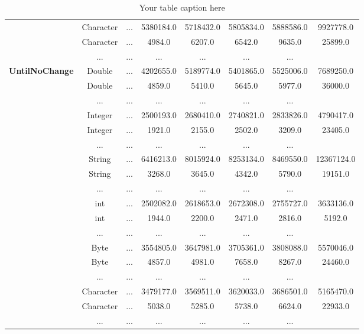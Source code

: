\documentclass{article}
\begin{document}
\begin{table}[h]
{\begin{tabular}{|c|c|c|c|c|c|c|c|}
 & Character & ... & 5380184.0 & 5718432.0 & 5805834.0 & 5888586.0 & 9927778.0 \\
 & Character & ... & 4984.0 & 6207.0 & 6542.0 & 9635.0 & 25899.0 \\
 & ... & ... & ... & ... & ... & ... \\

\textbf{UntilNoChange} & Double & ... & 4202655.0 & 5189774.0 & 5401865.0 & 5525006.0 & 7689250.0 \\
 & Double & ... & 4859.0 & 5410.0 & 5645.0 & 5977.0 & 36000.0 \\
 & ... & ... & ... & ... & ... & ... \\

 & Integer & ... & 2500193.0 & 2680410.0 & 2740821.0 & 2833826.0 & 4790417.0 \\
 & Integer & ... & 1921.0 & 2155.0 & 2502.0 & 3209.0 & 23405.0 \\
 & ... & ... & ... & ... & ... & ... \\

 & String & ... & 6416213.0 & 8015924.0 & 8253134.0 & 8469550.0 & 12367124.0 \\
 & String & ... & 3268.0 & 3645.0 & 4342.0 & 5790.0 & 19151.0 \\
 & ... & ... & ... & ... & ... & ... \\

 & int & ... & 2502082.0 & 2618653.0 & 2672308.0 & 2755727.0 & 3633136.0 \\
 & int & ... & 1944.0 & 2200.0 & 2471.0 & 2816.0 & 5192.0 \\
 & ... & ... & ... & ... & ... & ... \\
\hline
 & Byte & ... & 3554805.0 & 3647981.0 & 3705361.0 & 3808088.0 & 5570046.0 \\
 & Byte & ... & 4857.0 & 4981.0 & 7658.0 & 8267.0 & 24460.0 \\
 & ... & ... & ... & ... & ... & ... \\

 & Character & ... & 3479177.0 & 3569511.0 & 3620033.0 & 3686501.0 & 5165470.0 \\
 & Character & ... & 5038.0 & 5285.0 & 5738.0 & 6624.0 & 22933.0 \\
 & ... & ... & ... & ... & ... & ... \\
\hline
\end{tabular}%
}
\caption{Your table caption here}
\label{tab:mytable}
\end{table}
\end{document}
